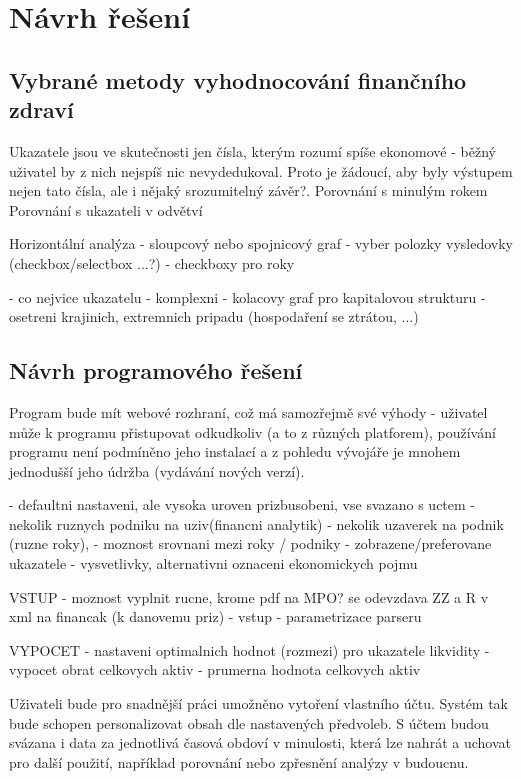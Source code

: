 \chapter{Návrh řešení}
\section{Vybrané metody vyhodnocování finančního zdraví}
Ukazatele jsou ve skutečnosti jen čísla, kterým rozumí spíše ekonomové - běžný uživatel by z nich nejspíš nic nevydedukoval. Proto je žádoucí, aby byly výstupem nejen tato čísla, ale i nějaký srozumitelný závěr?.
Porovnání s minulým rokem
Porovnání s ukazateli v odvětví

Horizontální analýza
- sloupcový nebo spojnicový graf
- vyber polozky vysledovky (checkbox/selectbox ...?)
- checkboxy pro roky

- co nejvice ukazatelu - komplexni
- kolacovy graf pro kapitalovou strukturu
- osetreni krajinich, extremnich pripadu (hospodaření se ztrátou, ...)

\section{Návrh programového řešení}
Program bude mít webové rozhraní, což má samozřejmě své výhody - uživatel může k programu přistupovat odkudkoliv (a to z různých platforem), používání programu není podmíněno jeho instalací a z pohledu vývojáře je mnohem jednodušší jeho údržba (vydávání nových verzí).

- defaultni nastaveni, ale vysoka uroven prizbusobeni, vse svazano s uctem
- nekolik ruznych podniku na uziv(financni analytik)
- nekolik uzaverek na podnik (ruzne roky),
- moznost srovnani mezi roky / podniky
- zobrazene/preferovane ukazatele
- vysvetlivky, alternativni oznaceni ekonomickych pojmu


 
VSTUP
- moznost vyplnit rucne, krome pdf na MPO? se odevzdava ZZ a R v xml na financak (k danovemu priz)
- vstup - parametrizace parseru


VYPOCET
- nastaveni optimalnich hodnot (rozmezi) pro ukazatele likvidity
- vypocet obrat celkovych aktiv - prumerna hodnota celkovych aktiv

Uživateli bude pro snadnější práci umožněno vytoření vlastního účtu. Systém tak bude schopen personalizovat obsah dle nastavených předvoleb. S účtem budou svázana i data za jednotlivá časová obdoví v minulosti, která lze nahrát a uchovat pro další použití, například porovnání nebo zpřesnění analýzy v budoucnu.

